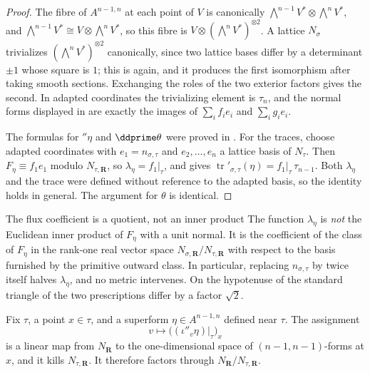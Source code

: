 \begin{proof}
The fibre of $A^{n-1,n}$ at each point of $V$ is canonically
$\bigwedge^{n-1}V^*\otimes\bigwedge^nV^*$, and
$\bigwedge^{n-1}V^*\cong V\otimes\bigwedge^nV^*$, so
this fibre is $V\otimes(\bigwedge^nV^*)^{\otimes2}$.  A lattice
$N_\sigma$ trivializes $(\bigwedge^nV^*)^{\otimes2}$ canonically, since two
lattice bases differ by a determinant $\pm1$ whose square is $1$; this is
 again, and it produces the first
isomorphism after taking smooth sections.  Exchanging the roles of the
two exterior factors gives the
second.  In adapted coordinates the trivializing element is $\tau_n$, and the
normal forms displayed in  are exactly the
images of $\sum_if_ie_i$ and $\sum_ig_ie_i$.

The formulas for $\dprime\eta$ and $\ddprime\theta$ were proved in
.  For the traces, choose adapted
coordinates with $e_1=n_{\sigma,\tau}$ and $e_2,\ldots,e_n$ a lattice basis
of $N_\tau$.  Then $F_\eta\equiv f_1e_1$ modulo $N_{\tau,\mathbf R}$, so
$\lambda_\eta=f_1|_\tau$, and  gives
$\operatorname{tr}'_{\sigma,\tau}(\eta)=f_1|_\tau\,\tau_{n-1}$.  Both
$\lambda_\eta$ and the trace were defined without reference to the adapted
basis, so the identity holds in general.  The argument for $\theta$ is
identical.
\end{proof}

\par\noindent\begin{minipage}{\linewidth}
\begin{warning}{The flux coefficient is a quotient, not an inner product}
The function $\lambda_\eta$ is \emph{not} the Euclidean inner product of
$F_\eta$ with a unit normal.  It is the coefficient of the class of $F_\eta$
in the rank-one real vector space $N_{\sigma,\mathbf R}/N_{\tau,\mathbf R}$
with respect to the basis furnished by the primitive outward class.  In
particular, replacing $n_{\sigma,\tau}$ by twice itself halves
$\lambda_\eta$, and no metric intervenes.  On the hypotenuse of the standard
triangle of  the two prescriptions differ
by a factor $\sqrt2$.
\end{warning}
\end{minipage}\par

\begin{corollary}
\label{cor:ch11-trace-additive}
Fix $\tau$, a point $x\in\tau$, and a superform
$\eta\in A^{n-1,n}$ defined near $\tau$.  The
assignment
\[
 v\longmapsto \bigl((\iota''_v\eta)|_\tau\bigr)_x
\]
is a linear map from $N_{\mathbf R}$ to the one-dimensional space of
$(n-1,n-1)$-forms at $x$, and it kills
$N_{\tau,\mathbf R}$.  It therefore factors through
$N_{\mathbf R}/N_{\tau,\mathbf R}$.
\end{corollary}

